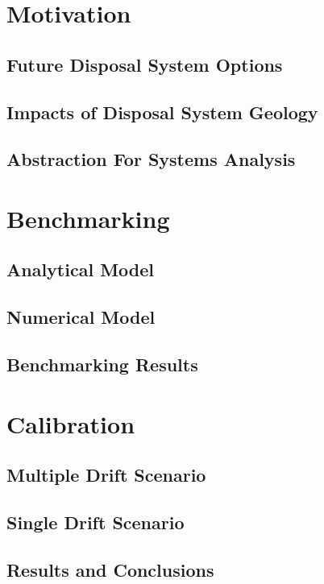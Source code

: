 

\section{Motivation}
\subsection{Future Disposal System Options}

\subsection{Impacts of Disposal System Geology}

\subsection{Abstraction For Systems Analysis}


\section{Benchmarking}
\subsection{Analytical Model}

\subsection{Numerical Model}

\subsection{Benchmarking Results}


\section{Calibration}
\subsection{Multiple Drift Scenario}

\subsection{Single Drift Scenario}

\subsection{Results and Conclusions}



